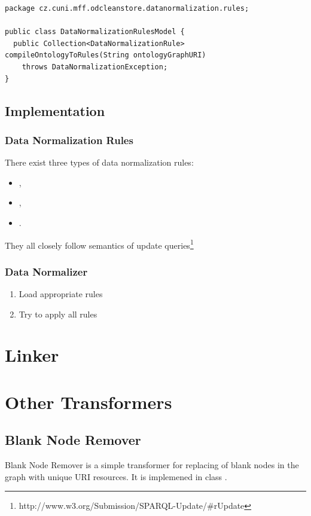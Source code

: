 \begin{lstlisting}[caption=Data Normalization Rule Generation,label=lst:dataNormalizationRulesModel]
package cz.cuni.mff.odcleanstore.datanormalization.rules;

public class DataNormalizationRulesModel {
  public Collection<DataNormalizationRule> compileOntologyToRules(String ontologyGraphURI)
    throws DataNormalizationException;
}
\end{lstlisting}


\subsection{Implementation}

\subsubsection*{Data Normalization Rules}

There exist three types of data normalization rules:

\begin{itemize}
	\item {},
	\item {},
	\item {}.
\end{itemize}

They all closely follow semantics of  update queries\footnote{http://www.w3.org/Submission/SPARQL-Update/#rUpdate}

\subsubsection*{Data Normalizer}

\begin{enumerate}
	\item Load appropriate rules
	\item Try to apply all rules
\end{enumerate}
\section{Linker}
\section{Other Transformers}
\subsection{Blank Node Remover}
Blank Node Remover is a simple transformer for replacing of blank nodes in the  graph with unique URI resources. It is implemened in class .

